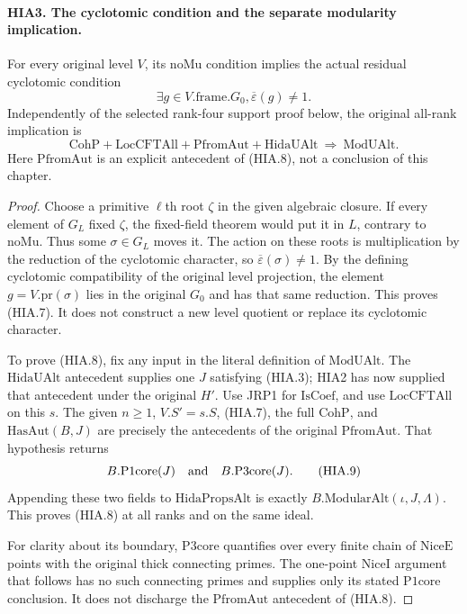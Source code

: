 \documentclass[11pt,a4paper]{article}
\numberwithin{equation}{section}
\theoremstyle{remark}\newtheorem{remark}[theorem]{Remark}
\begin{document}
\paragraph{HIA3. The cyclotomic condition and the separate modularity implication.}
\label{claim:HIA3}
For every original level \(V\), its \(\mathrm{noMu}\)
condition implies the actual residual cyclotomic condition
\[
 \exists g\in V.\mathrm{frame}.G_0,
                 \overline\varepsilon(g)\ne1.
 \tag{HIA.7}
\]
Independently of the selected rank-four support proof below,
the original all-rank implication is
\[
 \mathrm{CohP}+\mathrm{LocCFTAll}+\mathrm{PfromAut}
              +\mathrm{HidaUAlt}
                       \ \Longrightarrow\ \mathrm{ModUAlt}.
 \tag{HIA.8}
\]
Here \(\mathrm{PfromAut}\) is an explicit antecedent of
(HIA.8), not a conclusion of this chapter.
\begin{proof}
Choose a primitive \(\ell\)th root \(\zeta\) in the
given algebraic closure.  If every element of \(G_L\)
fixed \(\zeta\), the fixed-field theorem would put it
in \(L\), contrary to \(\mathrm{noMu}\).  Thus some
\(\sigma\in G_L\) moves it.  The action on these roots
is multiplication by the reduction of the cyclotomic
character, so \(\overline\varepsilon(\sigma)\ne1\).
By the defining cyclotomic compatibility of the original
level projection, the element \(g=V.\mathrm{pr}(\sigma)\)
lies in the original \(G_0\) and has that same reduction.
This proves (HIA.7).  It does not construct a new level
quotient or replace its cyclotomic character.

To prove (HIA.8), fix any input in the literal definition
of \(\mathrm{ModUAlt}\).  The \(\mathrm{HidaUAlt}\)
antecedent supplies one \(J\) satisfying (HIA.3); HIA2
has now supplied that antecedent under the original \(H'\).
Use JRP1 for \(\mathrm{IsCoef}\), and use
\(\mathrm{LocCFTAll}\) on this \(s\).
The given \(n\geq1\), \(V.S'=s.S\), (HIA.7), the full
\(\mathrm{CohP}\), and \(\mathrm{HasAut}(B,J)\) are
precisely the antecedents of the original
\(\mathrm{PfromAut}\).  That hypothesis returns
\[
                       B.\mathrm{P1core}(J)
                          \quad\hbox{and}\quad
                       B.\mathrm{P3core}(J).
 \tag{HIA.9}
\]
Appending these two fields to \(\mathrm{HidaPropsAlt}\)
is exactly \(B.\mathrm{ModularAlt}(\iota,J,\Lambda)\).
This proves (HIA.8) at all ranks and on the same ideal.

For clarity about its boundary, \(\mathrm{P3core}\)
quantifies over every finite chain of \(\mathrm{NiceE}\)
points with the original thick connecting primes.  The
one-point \(\mathrm{NiceI}\) argument that follows has
no such connecting primes and supplies only its stated
\(\mathrm{P1core}\) conclusion.  It does not discharge
the \(\mathrm{PfromAut}\) antecedent of (HIA.8).
\end{proof}
\end{document}

